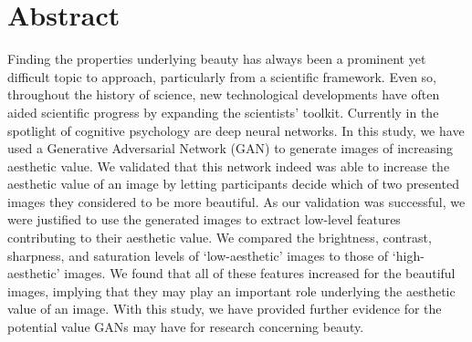 \documentclass[../main.tex]{subfiles}
\begin{document}
\newpage
\section{Abstract}
Finding the properties underlying beauty has always been a prominent yet difficult topic to approach, particularly from a scientific framework. Even so, throughout the history of science, new technological developments have often aided scientific progress by expanding the scientists' toolkit. Currently in the spotlight of cognitive psychology are deep neural networks. In this study, we have used a Generative Adversarial Network (GAN) to generate images of increasing aesthetic value. We validated that this network indeed was able to increase the aesthetic value of an image by letting participants decide which of two presented images they considered to be more beautiful. As our validation was successful, we were justified to use the generated images to extract low-level features contributing to their aesthetic value. We compared the brightness, contrast, sharpness, and saturation levels of `low-aesthetic' images to those of `high-aesthetic' images. We found that all of these features increased for the beautiful images, implying that they may play an important role underlying the aesthetic value of an image. With this study, we have provided further evidence for the potential value GANs may have for research concerning beauty.
\end{document}
